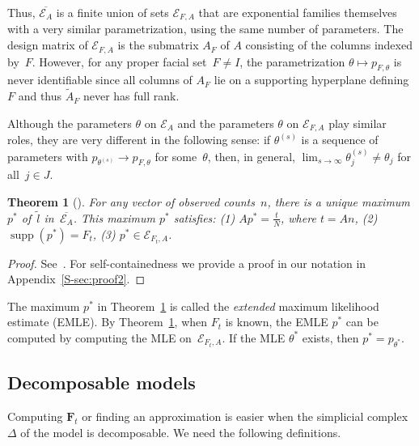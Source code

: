 \documentclass[aos,noinfoline]{imsart}
\DeclareMathOperator{\supp}{supp}
\newcommand{\Ecal}{\mathcal{E}}
\newcommand{\Fbf}{\mathbf{F}}
\newcommand{\ol}[1]{\overline{#1}}
\newtheorem{theorem}{Theorem}[section]
\theoremstyle{remark}
\theoremstyle{definition}
\begin{document}
Thus, $\ol{\Ecal_{A}}$ is a finite union of sets $\Ecal_{F,A}$ that are exponential families themselves with a very
similar parametrization, using the same number of parameters.  The design matrix of $\Ecal_{F,A}$ is the submatrix
$A_{F}$ of $A$ consisting of the columns indexed by~$F$.  However, for any proper facial set~$F\neq I$, the
parametrization $\theta\mapsto p_{F,\theta}$ is never identifiable since all
columns of $A_{F}$ lie on a supporting hyperplane defining~$F$ and thus $\tilde A_{F}$ never has full rank.

Although the parameters $\theta$ on $\Ecal_{A}$ and the parameters $\theta$ on
$\Ecal_{F,A}$ play similar roles, they are very different in the following sense: if $\theta^{(s)}$ is a sequence of
parameters with $p_{\theta^{(s)}}\to p_{F,\theta}$ for some~$\theta$, then, in general,
$\lim_{s\to\infty}\theta^{(s)}_{j}\neq\theta_{j}$ for all~$j\in J$.
\begin{theorem}[\cite{Barndorff:exponential_families}]
  \label{thm:gmle}
  For any vector of observed counts~$n$, there is a unique maximum $p^{*}$ of~$\tilde l$ in~$\overline{\Ecal_{A}}$.
  This maximum $p^{*}$ satisfies:
  (1) $A p^{*} = \frac tN$, where $t = An$,
  (2) $\supp(p^{*}) = F_{t}$,
  (3) $p^{*}\in\Ecal_{F_{t},A}$.
\end{theorem}
\begin{proof}
  See~\cite{Barndorff:exponential_families}.
  For self-containedness we provide a proof in our notation in Appendix~\ref{S-sec:proof2}.
\end{proof}
  The maximum $p^{*}$ in Theorem~\ref{thm:gmle} is called the \emph{extended} maximum likelihood estimate (EMLE).
By Theorem~\ref{thm:gmle}, when $F_{t}$ is known, the EMLE $p^{*}$ can be computed by computing the MLE
on~$\Ecal_{F_{t},A}$.  If the MLE $\theta^{*}$ exists, then $p^{*}=p_{\theta^{*}}$.  


\subsection{Decomposable models}
\label{sec:reducible-models}

Computing $\Fbf_{t}$ or finding an approximation is easier when the simplicial complex $\Delta$ of the model is
decomposable.  We need the following definitions.
\end{document}
